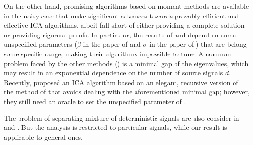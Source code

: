 \documentclass{article} %
\theoremstyle{definition}
\begin{document}
On the other hand, promising algorithms based on moment methods are available in the noisy case that make significant advances towards provably efficient and effective ICA algorithms, albeit fall short of either providing a complete solution or providing rigorous proofs. \citep{anandkumar2012tensordecomposition,anandkumar2012method, arora2012provable, hsu2013learning, goyal2014fourier}
In particular, the results of \citep{arora2012provable} and \cite{goyal2014fourier} depend on some  unspecified parameters ($\beta$ in the paper of \citep{arora2012provable} and $\sigma$ in the paper of \citep{goyal2014fourier}) that are belong some specific range, making their algorithms impossible to tune.
A common problem faced by the other methods (\citep{anandkumar2012tensordecomposition,anandkumar2012method,hsu2013learning}) is a minimal gap of the eigenvalues, which may result in an exponential dependence on the number of source signals $d$. 
Recently, \citet{vempala2014max} proposed an ICA algorithm based on an elegant, recursive version of the method of \citet{goyal2014fourier} that avoids dealing with the aforementioned minimal gap; however, they still need an oracle to set the unspecified parameter of \citet{goyal2014fourier}.

The problem of separating mixture of deterministic signals are also consider in \citep{kirimoto2011separation} and \citep{forootan2013separation}. But the analysis is restricted to particular signals, while our result is applicable to general ones. 
\end{document}
